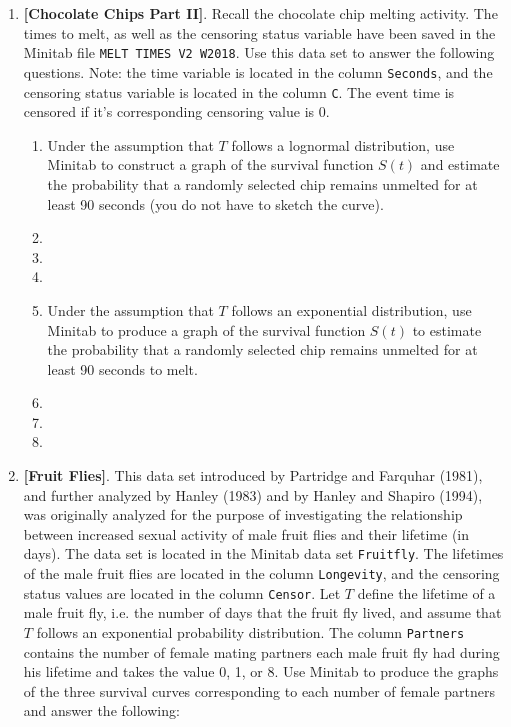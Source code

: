 \begin{enumerate}
\item \textbf{[Chocolate Chips Part II]}. Recall the chocolate chip melting activity.  The times to melt, as well as the censoring status variable have been saved in the Minitab file \texttt{MELT TIMES V2 W2018}.  Use this data set to answer the following questions. Note: the time variable is located in the column \texttt{Seconds}, and  the censoring status variable
is located in the column \texttt{C}. The event time is censored if it's corresponding censoring value is  0.
\begin{enumerate}
\item Under the assumption that $T$ follows a lognormal distribution, use Minitab to construct a graph of the survival function $S(t)$ and estimate the probability that a randomly selected chip remains unmelted for at least 90 seconds (you do not have to sketch the curve).
\item[]
\item[]
\item[]
\item Under the assumption that $T$ follows an exponential distribution, use Minitab to produce a graph of the survival
function $S(t)$ to estimate the probability that a randomly selected chip remains unmelted for at least 90 seconds to melt.
\item[]
\item[]
\item[]
\end{enumerate}
\item \textbf{[Fruit Flies]}. This data set introduced by Partridge and Farquhar (1981), and further
analyzed by Hanley (1983) and by Hanley and Shapiro (1994), was originally analyzed for the purpose of investigating the relationship between increased sexual activity of male fruit flies and their lifetime (in days). The data set is located in the Minitab data set \texttt{Fruitfly}.  The lifetimes of the male fruit flies are located in the column \texttt{Longevity}, and the censoring status values are located in the column \texttt{Censor}.  Let $T$ define the lifetime of a male fruit fly, i.e. the number of days that the fruit fly lived, and assume that $T$ follows an exponential probability distribution. The column \texttt{Partners} contains the number of female mating partners each male fruit fly had during his lifetime and takes the
value 0, 1, or 8. Use Minitab to produce the graphs of the three survival curves corresponding to each number of female partners and answer the following:
\begin{enumerate}

\end{enumerate}
\end{enumerate}
